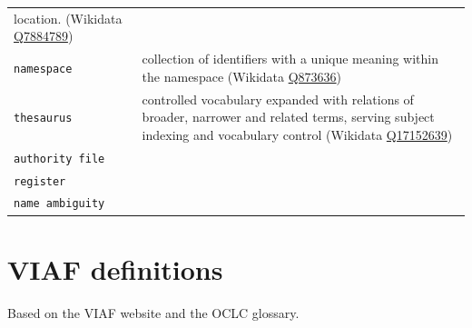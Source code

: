 \documentclass[
  letterpaper,
  DIV=11,
  numbers=noendperiod]{scrreprt}
\begin{document}
\begin{longtable}[]{@{}
  >{\raggedright\arraybackslash}p{}
  >{\raggedright\arraybackslash}p{}@{}}
location. (Wikidata
\href{https://www.wikidata.org/wiki/Q7884789}{Q7884789}) \\
\texttt{namespace} & collection of identifiers with a unique meaning
within the namespace (Wikidata
\href{https://www.wikidata.org/wiki/Q873636}{Q873636}) \\
\texttt{thesaurus} & controlled vocabulary expanded with relations of
broader, narrower and related terms, serving subject indexing and
vocabulary control (Wikidata
\href{https://www.wikidata.org/wiki/Q17152639}{Q17152639}) \\
\texttt{authority\ file} & \\
\texttt{register} & \\
\texttt{name\ ambiguity} \textbar{} \textbar{} & \\
\end{longtable}

\section*{VIAF definitions}\label{viaf-definitions}


Based on the VIAF website and the OCLC glossary.
\end{document}
